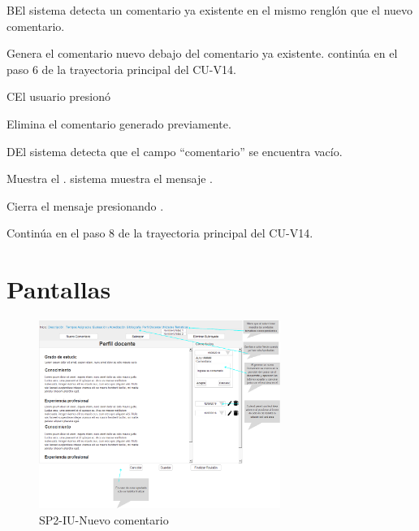 \label{SP2-CU14-B}
\begin{UCtrayectoriaA}{B}{El sistema detecta un comentario ya existente en el mismo renglón que el nuevo comentario.}

    \UCpaso Genera el comentario nuevo debajo del comentario ya existente. 
    \UCpaso continúa en el paso 6 de la trayectoria principal del CU-V14.
\end{UCtrayectoriaA}

\label{SP2-CU14-C}
\begin{UCtrayectoriaA}{C}{El usuario presionó }

	\UCpaso Elimina el comentario generado previamente.
\end{UCtrayectoriaA}

\label{SP2-CU14-D}
\begin{UCtrayectoriaA}{D}{El sistema detecta que el campo “comentario” se encuentra vacío.} 

	\UCpaso Muestra el .
    \UCpasoEl sistema muestra el mensaje .

    \UCpaso[\UCactor] Cierra el mensaje presionando .

    \UCpaso Continúa en el paso 8 de la trayectoria principal del CU-V14.
\end{UCtrayectoriaA}

\chapter{Pantallas}
 \begin{figure}
  \centering
    \includegraphics[width=0.7\textwidth]{DCU/SP2/Pantallas/Nuevo_comentario}
  \caption{SP2-IU-Nuevo comentario}
  \label{SP2-IU-Nuevo_comentario}
\end{figure}
